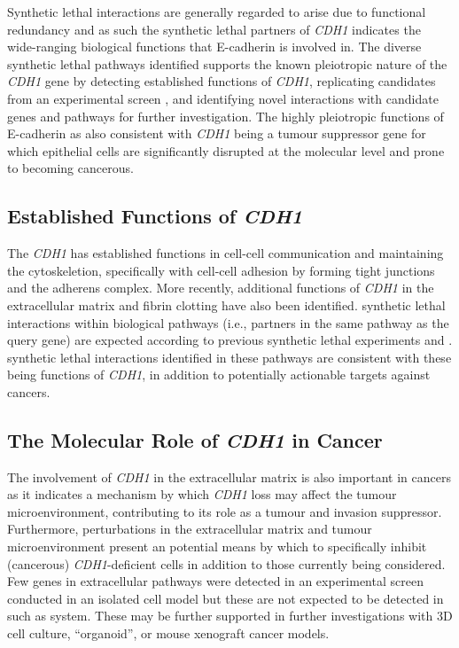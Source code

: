 Synthetic lethal interactions are generally regarded to arise due to \gls{functional redundancy} \citep{Boone2007, Kaelin2005, Fece2015} and as such the \gls{synthetic lethal} partners of \textit{CDH1} indicates the wide-ranging biological functions that \gls{E-cadherin} is involved in. The diverse \gls{synthetic lethal} pathways identified supports the known pleiotropic nature of the \textit{CDH1} gene by detecting established functions of \textit{CDH1}, replicating candidates from an experimental screen \citep{Telford2015}, and identifying novel interactions with candidate genes and pathways for further investigation. The highly pleiotropic functions of \gls{E-cadherin} as also consistent with \textit{CDH1} being a \gls{tumour suppressor} gene for which epithelial cells are significantly disrupted at the molecular level and prone to becoming cancerous.

\subsection{Established Functions of \textit{CDH1}}
\label{chapt6:function}

The \textit{CDH1} has established functions in cell-cell communication and maintaining the cytoskeletion, specifically with cell-cell adhesion by forming tight junctions and the adherens complex. More recently, additional functions of \textit{CDH1} in the extracellular matrix and fibrin clotting have also been identified. \Gls{synthetic lethal} interactions within biological pathways (i.e., partners in the same pathway as the query gene) are expected according to previous \gls{synthetic lethal} experiments and  \citep{Kelley2005, Boone2007}. \Gls{synthetic lethal} interactions identified in these pathways are consistent with these being functions of \textit{CDH1}, in addition to potentially actionable targets against cancers.


\subsection{The Molecular Role of \textit{CDH1} in Cancer}
\label{chapt6:cancer}

The involvement of \textit{CDH1} in the extracellular matrix is also important in cancers as it indicates a mechanism by which \textit{CDH1} loss may affect the tumour microenvironment, contributing to its role as a tumour and invasion suppressor. Furthermore, perturbations in the extracellular matrix and tumour microenvironment present an potential means by which to specifically inhibit (cancerous) \textit{CDH1}-deficient cells in addition to those currently being considered. Few genes in extracellular pathways were detected in an experimental screen \citep{Telford2015} conducted in an isolated cell model \citep{Chen2014} but these are not expected to be detected in such as system. These may be further supported in further investigations with 3D cell culture, ``organoid'', or mouse xenograft cancer models.

